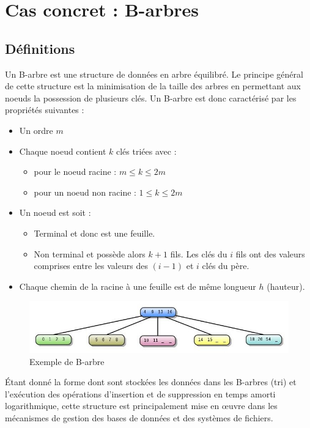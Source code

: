 \chapter[B-arbres]{Cas concret : B-arbres%
}
\section{Définitions}
Un B-arbre est une structure de données en arbre équilibré. Le principe général de cette structure est la minimisation de la taille des arbres en permettant aux noeuds la possession de plusieurs clés. Un B-arbre est donc caractérisé par les propriétés suivantes :
\begin{itemize}
\item Un ordre $m$
\item Chaque noeud contient $k$ clés triées avec :
\begin{itemize}
\item pour le noeud racine : $m \leq k \leq 2m$
\item pour un noeud non racine : $1 \leq k \leq 2m$
\end{itemize}
\item Un noeud est soit :
\begin{itemize}
\item Terminal et donc est une feuille.
\item Non terminal et possède alors $k+1$ fils. Les clés du $i$ fils ont des valeurs comprises entre les valeurs des $(i-1)$ et $i$ clés du père.
\end{itemize}
\item Chaque chemin de la racine à une feuille est de même longueur $h$ (hauteur).
\end{itemize}

\begin{figure}[h]
	\centering
	\includegraphics[scale=0.5]{barbre}
	\caption{Exemple de B-arbre}
	\label{fig:barbre}
\end{figure}

Étant donné la forme dont sont stockées les données dans les B-arbres (tri) et l'exécution des opérations d'insertion et de suppression en temps amorti logarithmique, cette structure est principalement mise en œuvre dans les mécanismes de gestion des bases de données et des systèmes de fichiers.
